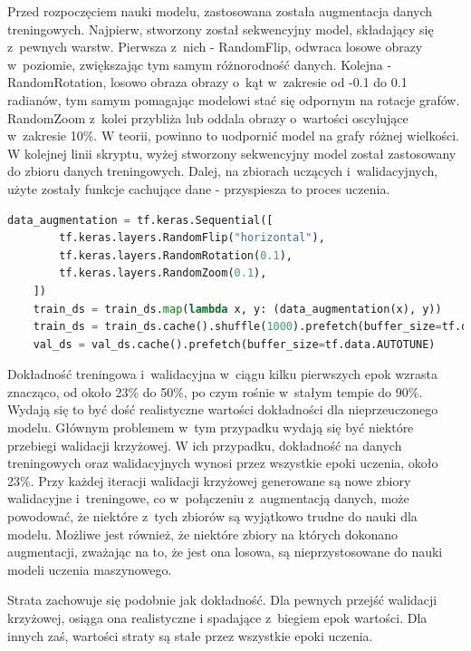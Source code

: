 Przed rozpoczęciem nauki modelu, zastosowana została augmentacja danych treningowych.
Najpierw, stworzony został sekwencyjny model, składający się z~pewnych warstw.
Pierwsza z~nich - RandomFlip, odwraca losowe obrazy w~poziomie, zwiększając tym samym różnorodność danych.
Kolejna - RandomRotation, losowo obraza obrazy o~kąt w~zakresie od -0.1 do 0.1 radianów,
tym samym pomagając modelowi stać się odpornym na rotacje grafów.
RandomZoom z~kolei przybliża lub oddala obrazy o~wartości oscylujące w~zakresie 10\%.
W teorii, powinno to uodpornić model na grafy różnej wielkości.
W kolejnej linii skryptu, wyżej stworzony sekwencyjny model został zastosowany do zbioru danych treningowych.
Dalej, na zbiorach uczących i~walidacyjnych, użyte zostały funkcje cachujące dane - przyspiesza to proces uczenia.

\begin{lstlisting}[language=Python,caption=Listing zmodyfikowanego skryptu poprzedzającego tworzenie modelu z~walidacją krzyżową
	- wersja 3,label={tests-model-crossval3}]
	data_augmentation = tf.keras.Sequential([
        tf.keras.layers.RandomFlip("horizontal"),
        tf.keras.layers.RandomRotation(0.1),
        tf.keras.layers.RandomZoom(0.1),
    ])
    train_ds = train_ds.map(lambda x, y: (data_augmentation(x), y))
    train_ds = train_ds.cache().shuffle(1000).prefetch(buffer_size=tf.data.AUTOTUNE)
    val_ds = val_ds.cache().prefetch(buffer_size=tf.data.AUTOTUNE)
\end{lstlisting}

Dokładność treningowa i~walidacyjna w~ciągu kilku pierwszych epok wzrasta znacząco,
od około 23\% do 50\%, po czym rośnie w~stałym tempie do 90\%.
Wydają się to być dość realistyczne wartości dokładności dla nieprzeuczonego modelu.
Głównym problemem w~tym przypadku wydają się być niektóre przebiegi walidacji krzyżowej.
W ich przypadku, dokładność na danych treningowych oraz walidacyjnych wynosi przez wszystkie epoki uczenia, około 23\%.
Przy każdej iteracji walidacji krzyżowej generowane są nowe zbiory walidacyjne i~treningowe,
co w~połączeniu z~augmentacją danych, może powodować, że niektóre z~tych zbiorów są wyjątkowo trudne do nauki dla modelu.
Możliwe jest również, że niektóre zbiory na których dokonano augmentacji, zważając na to, że jest ona losowa,
są nieprzystosowane do nauki modeli uczenia maszynowego.

Strata zachowuje się podobnie jak dokładność. Dla pewnych przejść walidacji krzyżowej, osiąga ona realistyczne
i spadające z~biegiem epok wartości. Dla innych zaś, wartości straty są stałe przez wszystkie epoki uczenia.

